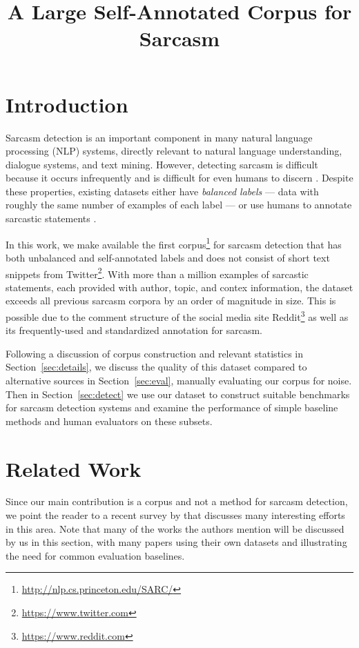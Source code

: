\documentclass[10pt, a4paper]{article}
\title{A Large Self-Annotated Corpus for Sarcasm}
\begin{document}
\maketitleabstract



\section{Introduction}
\label{sec:intro}

Sarcasm detection is an important component in many natural language processing (NLP) systems, directly relevant to natural language understanding, dialogue systems, and text mining.
However, detecting sarcasm is difficult because it occurs infrequently and is difficult for even humans to discern \cite{Wallace:14}.
Despite these properties, existing datasets either have {\em balanced labels} --- data with roughly the same number of examples of each label \cite{Gonzalez:11,Bamman:15,Joshi:15,Amir:16,Oraby:16} --- or use humans to annotate sarcastic statements \cite{Riloff:13,Swanson:14,Wallace:15}.

In this work, we make available the first corpus\footnote{\url{http://nlp.cs.princeton.edu/SARC/}} for sarcasm detection that has both unbalanced and self-annotated labels and does not consist of short text snippets from Twitter\footnote{\url{https://www.twitter.com}}.
With more than a million examples of sarcastic statements, each provided with author, topic, and contex information, the dataset exceeds all previous sarcasm corpora by an order of magnitude in size.
This is possible due to the comment structure of the social media site Reddit\footnote{\url{https://www.reddit.com}} as well as its frequently-used and standardized annotation for sarcasm.

Following a discussion of corpus construction and relevant statistics in Section~\ref{sec:details}, we discuss the quality of this dataset compared to alternative sources in Section~\ref{sec:eval}, manually evaluating our corpus for noise.
Then in Section~\ref{sec:detect} we use our dataset to construct suitable benchmarks for sarcasm detection systems and examine the performance of simple baseline methods and human evaluators on these subsets. 


\section{Related Work}
\label{sec:related}
Since our main contribution is a corpus and not a method for sarcasm detection, we point the reader to a recent survey by  that discusses many interesting efforts in this area.
Note that many of the works the authors mention will be discussed by us in this section, with many papers using their own datasets and illustrating the need for common evaluation baselines.
\end{document}
